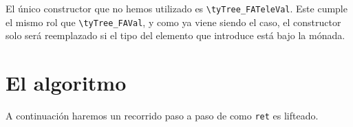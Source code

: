 El único constructor que no hemos utilizado es \lstinline{\tyTree_FATeleVal}.
Este cumple el mismo rol que \lstinline{\tyTree_FAVal}, y como ya viene siendo el caso, el constructor solo será reemplazado si el tipo del elemento que introduce está bajo la mónada.

\iffalse
Tomemos una función de ejemplo con la siguiente signatura.

\begin{lstlisting}
\forall (T : Type) (R : T -> Type) (t : T), M (R t)
$\equiv$
\tyTree_FAType \; (fun T => \tyTree_FAType \; (fun R : T -> Type => \tyTree_FAVal \; T (fun t => \tyTree_M \; (R t))))
\end{lstlisting}

La traducción será muy directa.

\begin{lstlisting}
\tyTree_FAType \; (fun T => \tyTree_FATeleType \; (fun R : T -> Type => \tyTree_FATeleVal \; T (fun t => \tyTree_M \; (R t))))
\end{lstlisting}

Notar que el primer constructor no es reemplazado ya que \lstinline{T} no se encuentra bajo la mónada en ningún momento.
\fi

\section{El algoritmo}

A continuación haremos un recorrido paso a paso de como \lstinline{ret} es lifteado.


